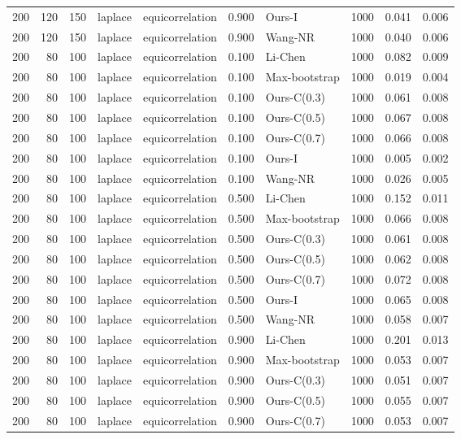 \begin{tabular}{rrrllrlrrr}
200 & 120 & 150 & laplace & equicorrelation & 0.900 & Ours-I & 1000 & 0.041 & 0.006 \\
200 & 120 & 150 & laplace & equicorrelation & 0.900 & Wang-NR & 1000 & 0.040 & 0.006 \\
200 & 80 & 100 & laplace & equicorrelation & 0.100 & Li-Chen & 1000 & 0.082 & 0.009 \\
200 & 80 & 100 & laplace & equicorrelation & 0.100 & Max-bootstrap & 1000 & 0.019 & 0.004 \\
200 & 80 & 100 & laplace & equicorrelation & 0.100 & Ours-C(0.3) & 1000 & 0.061 & 0.008 \\
200 & 80 & 100 & laplace & equicorrelation & 0.100 & Ours-C(0.5) & 1000 & 0.067 & 0.008 \\
200 & 80 & 100 & laplace & equicorrelation & 0.100 & Ours-C(0.7) & 1000 & 0.066 & 0.008 \\
200 & 80 & 100 & laplace & equicorrelation & 0.100 & Ours-I & 1000 & 0.005 & 0.002 \\
200 & 80 & 100 & laplace & equicorrelation & 0.100 & Wang-NR & 1000 & 0.026 & 0.005 \\
200 & 80 & 100 & laplace & equicorrelation & 0.500 & Li-Chen & 1000 & 0.152 & 0.011 \\
200 & 80 & 100 & laplace & equicorrelation & 0.500 & Max-bootstrap & 1000 & 0.066 & 0.008 \\
200 & 80 & 100 & laplace & equicorrelation & 0.500 & Ours-C(0.3) & 1000 & 0.061 & 0.008 \\
200 & 80 & 100 & laplace & equicorrelation & 0.500 & Ours-C(0.5) & 1000 & 0.062 & 0.008 \\
200 & 80 & 100 & laplace & equicorrelation & 0.500 & Ours-C(0.7) & 1000 & 0.072 & 0.008 \\
200 & 80 & 100 & laplace & equicorrelation & 0.500 & Ours-I & 1000 & 0.065 & 0.008 \\
200 & 80 & 100 & laplace & equicorrelation & 0.500 & Wang-NR & 1000 & 0.058 & 0.007 \\
200 & 80 & 100 & laplace & equicorrelation & 0.900 & Li-Chen & 1000 & 0.201 & 0.013 \\
200 & 80 & 100 & laplace & equicorrelation & 0.900 & Max-bootstrap & 1000 & 0.053 & 0.007 \\
200 & 80 & 100 & laplace & equicorrelation & 0.900 & Ours-C(0.3) & 1000 & 0.051 & 0.007 \\
200 & 80 & 100 & laplace & equicorrelation & 0.900 & Ours-C(0.5) & 1000 & 0.055 & 0.007 \\
200 & 80 & 100 & laplace & equicorrelation & 0.900 & Ours-C(0.7) & 1000 & 0.053 & 0.007 \\

\end{tabular}

